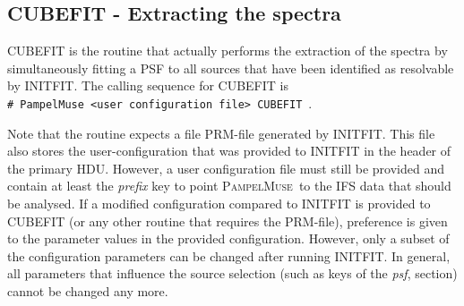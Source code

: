\documentclass[a4paper,10pt]{article}
\newcommand{\shellcmd}[1]{\\\indent\indent\texttt{\footnotesize\# #1}}
\newcommand{\pampelmuse}{\textsc{PampelMuse}\ }
\begin{document}
 
\subsection{CUBEFIT - Extracting the spectra}
\label{sec:cubefit}

CUBEFIT is the routine that actually performs the extraction of the spectra by simultaneously fitting a PSF to all sources that have been identified as resolvable by INITFIT. The calling sequence for CUBEFIT is
\shellcmd{PampelMuse <user configuration file> CUBEFIT}\ .

Note that the routine expects a file PRM-file generated by INITFIT. This file also stores the user-configuration that was provided to INITFIT in the header of the primary HDU. However, a user configuration file must still be provided and contain at least the \emph{prefix} key to point \pampelmuse to the IFS data that should be analysed. If a modified configuration compared to INITFIT is provided to CUBEFIT (or any other routine that requires the PRM-file), preference is given to the parameter values in the provided configuration. However, only a subset of the configuration parameters can be changed after running INITFIT. In general, all parameters that influence the source selection (such as keys of the \emph{psf}, section) cannot be changed any more.
\end{document}

